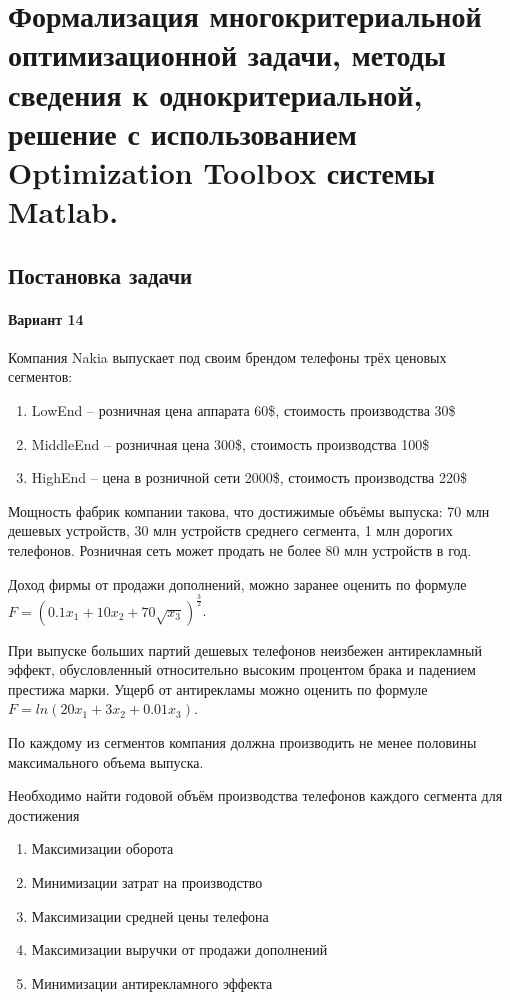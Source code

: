\chapter{Формализация многокритериальной оптимизационной задачи, методы сведения к однокритериальной, решение с использованием Optimization Toolbox системы Matlab.}

\section{Постановка задачи}

\subsubsection{Вариант 14}

Компания Nakia выпускает под своим брендом телефоны трёх ценовых сегментов:

\begin{enumerate}
	\item LowEnd – розничная цена аппарата 60\$, стоимость производства 30\$
	\item MiddleEnd – розничная цена 300\$, стоимость производства 100\$
	\item HighEnd – цена в розничной сети 2000\$, стоимость производства 220\$
\end{enumerate}

Мощность фабрик компании такова, что достижимые объёмы выпуска: 70 млн дешевых устройств, 30 млн устройств среднего сегмента, 1 млн дорогих телефонов. Розничная сеть может продать не более 80 млн устройств в год.

Доход фирмы от продажи дополнений, можно заранее оценить по формуле $F=(0.1x_1+10x_2+70\sqrt{x_3})^{\frac{3}{2}}$.

При выпуске больших партий дешевых телефонов неизбежен антирекламный эффект, обусловленный относительно высоким процентом брака и падением престижа марки. Ущерб от антирекламы можно оценить по формуле $F=ln(20x_1+3x_2+0.01x_3)$.

По каждому из сегментов компания должна производить не менее половины
максимального объема выпуска.

Необходимо найти годовой объём производства телефонов каждого сегмента
для достижения

\begin{enumerate}
	\item Максимизации оборота
	\item Минимизации затрат на производство
	\item Максимизации средней цены телефона
	\item Максимизации выручки от продажи дополнений
	\item Минимизации антирекламного эффекта
\end{enumerate}


